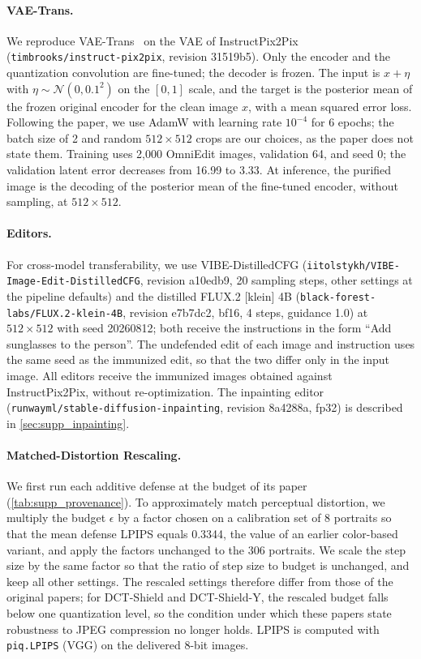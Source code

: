 \paragraph{VAE-Trans.} We reproduce VAE-Trans~\cite{purifyonce2026} on the VAE of InstructPix2Pix (\texttt{timbrooks/instruct-pix2pix}, revision 31519b5). Only the encoder and the quantization convolution are fine-tuned; the decoder is frozen. The input is $x + \eta$ with $\eta \sim \mathcal{N}(0, 0.1^2)$ on the $[0, 1]$ scale, and the target is the posterior mean of the frozen original encoder for the clean image $x$, with a mean squared error loss. Following the paper, we use AdamW with learning rate $10^{-4}$ for 6 epochs; the batch size of 2 and random $512\times512$ crops are our choices, as the paper does not state them. Training uses 2{,}000 OmniEdit images, validation 64, and seed 0; the validation latent error decreases from 16.99 to 3.33. At inference, the purified image is the decoding of the posterior mean of the fine-tuned encoder, without sampling, at $512\times512$.

\paragraph{Editors.} For cross-model transferability, we use VIBE-DistilledCFG (\texttt{iitolstykh/VIBE-Image-Edit-DistilledCFG}, revision a10edb9, 20 sampling steps, other settings at the pipeline defaults) and the distilled FLUX.2 [klein] 4B (\texttt{black-forest-labs/FLUX.2-klein-4B}, revision e7b7dc2, bf16, 4 steps, guidance 1.0) at $512\times512$ with seed 20260812; both receive the instructions in the form ``Add sunglasses to the person''. The undefended edit of each image and instruction uses the same seed as the immunized edit, so that the two differ only in the input image. All editors receive the immunized images obtained against InstructPix2Pix, without re-optimization. The inpainting editor (\texttt{runwayml/stable-diffusion-inpainting}, revision 8a4288a, fp32) is described in \cref{sec:supp_inpainting}.

\paragraph{Matched-Distortion Rescaling.} We first run each additive defense at the budget of its paper (\cref{tab:supp_provenance}). To approximately match perceptual distortion, we multiply the budget $\epsilon$ by a factor chosen on a calibration set of 8 portraits so that the mean defense LPIPS equals 0.3344, the value of an earlier color-based variant, and apply the factors unchanged to the 306 portraits. We scale the step size by the same factor so that the ratio of step size to budget is unchanged, and keep all other settings. The rescaled settings therefore differ from those of the original papers; for DCT-Shield and DCT-Shield-Y, the rescaled budget falls below one quantization level, so the condition under which these papers state robustness to JPEG compression no longer holds. LPIPS is computed with \texttt{piq.LPIPS} (VGG) on the delivered 8-bit images.

